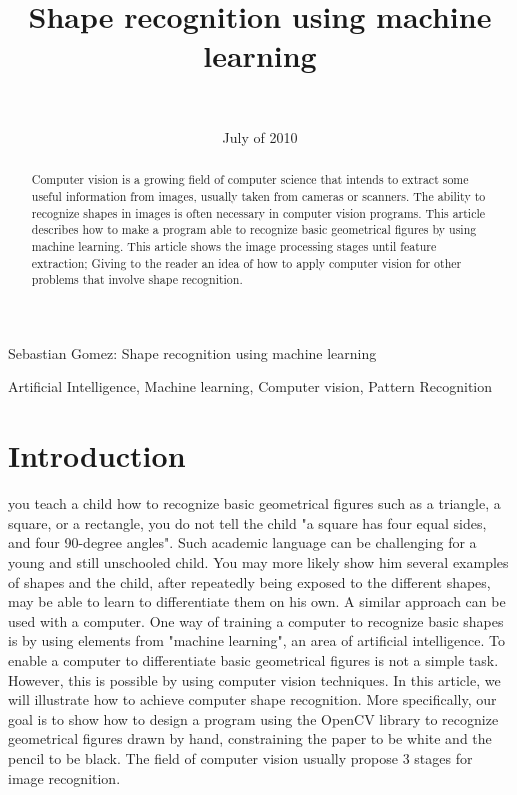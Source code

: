 \documentclass[10pt,journal]{IEEEtran}
\begin{document}
\title {Shape recognition using machine learning}
\author { \\
}
\date {July of 2010}

	{Sebastian Gomez: Shape recognition using machine learning}

	\maketitle

	\begin{abstract}
		Computer vision is a growing field of computer science that intends to extract
		some useful information from images, usually taken from cameras or scanners.
		The ability to recognize shapes in images is often necessary in computer vision
		programs. 
		This article describes how to make a program able to recognize basic 
		geometrical figures by using machine learning. This article shows the image 
		processing stages until	feature extraction; Giving to the reader an idea of how
		to apply computer vision for other problems that involve shape recognition.
	\end{abstract}
	
	\begin{IEEEkeywords}
	Artificial Intelligence, Machine learning, Computer vision, Pattern Recognition
	\end{IEEEkeywords}


	\section{Introduction}
	 you teach a child how to recognize basic geometrical figures such
	as a triangle, a square, or a rectangle, you do not tell the child "a square has four
	equal sides, and four 90-degree angles". Such academic language can be challenging for 
	a young and still unschooled child. You may more likely show him several examples
	of shapes and the child, after repeatedly being exposed to the different shapes, may 
	be able to learn to differentiate them on his own. \newline
	A similar approach can be used with a computer. One way of training a computer to
	recognize basic shapes is by using elements from "machine learning", an area of
	artificial intelligence. To enable a computer to differentiate basic geometrical 
	figures is not a simple task. However, this is possible by using computer vision 
	techniques. In this article, we will illustrate how to achieve computer shape 
	recognition. More specifically, our goal is to show how to design a program using
	the OpenCV library to recognize geometrical figures drawn by hand, constraining
	the paper to be white and the pencil to be black. The field of computer vision
	usually	propose 3 stages for image recognition.
	
\end{document}

